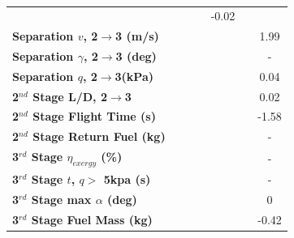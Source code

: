 \begin{table}[ht]
\begin{tabular}{l c c c c c c}
	& \secondthirdSeparationAltqStandard
	& \secondthirdSeparationAltqFiftyFive
	& \secondthirdSeparationAltqSixty
	&-0.02
	\\
	\textbf{Separation $v$, 2$\rightarrow$3 (m/s)}
	& \secondthirdSeparationvqForty
	& \secondthirdSeparationvqFortyFive
	& \secondthirdSeparationvqStandard
	& \secondthirdSeparationvqFiftyFive
	& \secondthirdSeparationvqSixty
	&1.99
	\\
	\textbf{Separation $\gamma$, 2$\rightarrow$3 (deg)}
	& \secondthirdSeparationgammaqForty
	& \secondthirdSeparationgammaqFortyFive
	& \secondthirdSeparationgammaqStandard
	& \secondthirdSeparationgammaqFiftyFive
	& \secondthirdSeparationgammaqSixty
	& -
	\\
	\textbf{Separation $q$, 2$\rightarrow$3(kPa)}
	& \secondthirdSeparationqqForty
	& \secondthirdSeparationqqFortyFive
	& \secondthirdSeparationqqStandard
	& \secondthirdSeparationqqFiftyFive
	& \secondthirdSeparationqqSixty
	&0.04
	\\
	\textbf{2$^{nd}$ Stage L/D, 2$\rightarrow$3}
	& \secondthirdSeparationLDqForty
	& \secondthirdSeparationLDqFortyFive
	& \secondthirdSeparationLDqStandard
	& \secondthirdSeparationLDqFiftyFive
	& \secondthirdSeparationLDqSixty
	&0.02
	\\
	\textbf{2$^{nd}$ Stage Flight Time (s)}
	& \secondFlightTimeqForty
	& \secondFlightTimeqFortyFive
	& \secondFlightTimeqStandard
	& \secondFlightTimeqFiftyFive
	& \secondFlightTimeqSixty
	&-1.58
	\\
	\textbf{2$^{nd}$ Stage Return Fuel (kg)}
	& \returnFuelqForty
	& \returnFuelqFortyFive
	& \returnFuelqStandard
	& \returnFuelqFiftyFive
	& \returnFuelqSixty
	& -
	\\
	\hline 
	\textbf{3$^{rd}$ Stage $\eta_{exergy}$ (\%)}
	& \textbf{\thirddExergyEffqForty}
	& \textbf{\thirddExergyEffqFortyFive}
	& \textbf{\thirddExergyEffqStandard}
	& \textbf{\thirddExergyEffqFiftyFive}
	& \textbf{\thirddExergyEffqSixty}
	& -
	\\
	
	\textbf{3$^{rd}$ Stage $t$, $q >$ 5kpa (s)}
	& \thirdqOverFiveqForty
	& \thirdqOverFiveqFortyFive
	& \thirdqOverFiveqStandard
	& \thirdqOverFiveqFiftyFive
	& \thirdqOverFiveqSixty
	& -
	\\
	\textbf{3$^{rd}$ Stage max $\alpha$ (deg)}
	& \thirdmaxAoAqForty
	& \thirdmaxAoAqFortyFive
	& \thirdmaxAoAqStandard
	& \thirdmaxAoAqFiftyFive
	& \thirdmaxAoAqSixty
	&0
	\\
	\textbf{3$^{rd}$ Stage Fuel Mass (kg)}
	& \thirdmFuelqForty
	& \thirdmFuelqFortyFive
	& \thirdmFuelqStandard
	& \thirdmFuelqFiftyFive
	& \thirdmFuelqSixty
	&-0.42
	\\
	\hline 
\end{tabular} 
\caption{}
\label{tab:qvarreturn}
\end{table}


